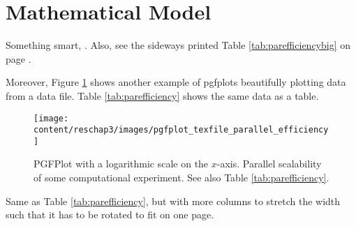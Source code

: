 \section{Mathematical Model}
Something smart, \cite{DoeJane2001}. Also, see the sideways printed Table \ref{tab:parefficiencybig} on page \pageref{tab:parefficiencybig}.

Moreover, Figure \ref{fig:parefficiency} shows another example of pgfplots beautifully plotting data from a data file. Table \ref{tab:parefficiency} shows the same data as a table.



\begin{figure}[p]
 \centering
 \texttt{[image: content/reschap3/images/pgfplot\_texfile\_parallel\_efficiency]}
 \caption{PGFPlot with a logarithmic scale on the $x$-axis. Parallel scalability of some computational experiment. See also Table \ref{tab:parefficiency}.}
 \label{fig:parefficiency}
\end{figure}

\begin{sidewaystable}[p]
  \centering
  \pgftablepareffbigger
  
  \pgfplotstabletypeset[columns={simid, speed-up, num_nodes_per_core, no_cores, pareff, totalwalltime, solve_time, newfraction, num_nodes, nodes2},
  ]\pgftablepareffbigger
  \caption{Same as Table \ref{tab:parefficiency}, but with more columns to stretch the width such that it has to be rotated to fit on one page.}
  \label{tab:parefficiencybig}
\end{sidewaystable}
